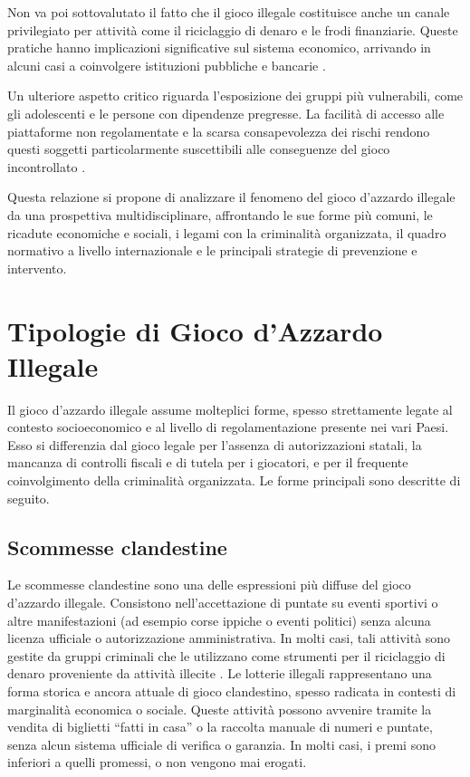 \documentclass[a4paper,12pt]{article}
\begin{document}
Non va poi sottovalutato il fatto che il gioco illegale costituisce anche un canale privilegiato per attività come il riciclaggio di denaro e le frodi finanziarie. Queste pratiche hanno implicazioni significative sul sistema economico, arrivando in alcuni casi a coinvolgere istituzioni pubbliche e bancarie \cite{tarina2019moneylaundering}.

Un ulteriore aspetto critico riguarda l’esposizione dei gruppi più vulnerabili, come gli adolescenti e le persone con dipendenze pregresse. La facilità di accesso alle piattaforme non regolamentate e la scarsa consapevolezza dei rischi rendono questi soggetti particolarmente suscettibili alle conseguenze del gioco incontrollato \cite{gori2014adolescentgambling, ferrara2019childrenrisk}.

Questa relazione si propone di analizzare il fenomeno del gioco d’azzardo illegale da una prospettiva multidisciplinare, affrontando le sue forme più comuni, le ricadute economiche e sociali, i legami con la criminalità organizzata, il quadro normativo a livello internazionale e le principali strategie di prevenzione e intervento.

\section{Tipologie di Gioco d'Azzardo Illegale}

Il gioco d'azzardo illegale assume molteplici forme, spesso strettamente legate al contesto socioeconomico e al livello di regolamentazione presente nei vari Paesi. Esso si differenzia dal gioco legale per l’assenza di autorizzazioni statali, la mancanza di controlli fiscali e di tutela per i giocatori, e per il frequente coinvolgimento della criminalità organizzata. Le forme principali sono descritte di seguito.

\subsection{Scommesse clandestine}

Le scommesse clandestine sono una delle espressioni più diffuse del gioco d’azzardo illegale. Consistono nell’accettazione di puntate su eventi sportivi o altre manifestazioni (ad esempio corse ippiche o eventi politici) senza alcuna licenza ufficiale o autorizzazione amministrativa. In molti casi, tali attività sono gestite da gruppi criminali che le utilizzano come strumenti per il riciclaggio di denaro proveniente da attività illecite \cite{lucchini2022socialcosts, banks2018taxonomy}.
Le lotterie illegali rappresentano una forma storica e ancora attuale di gioco clandestino, spesso radicata in contesti di marginalità economica o sociale. Queste attività possono avvenire tramite la vendita di biglietti “fatti in casa” o la raccolta manuale di numeri e puntate, senza alcun sistema ufficiale di verifica o garanzia. In molti casi, i premi sono inferiori a quelli promessi, o non vengono mai erogati.
\end{document}
